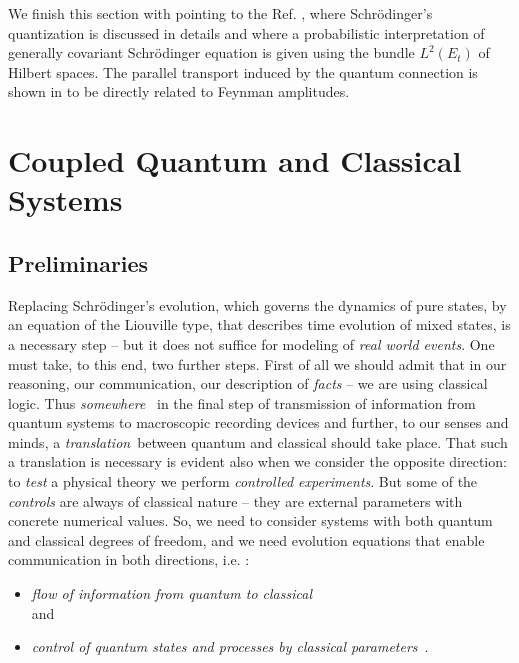 \documentclass[12pt]{article}
\begin{document}
We finish this section with pointing to the Ref.  \cite{jamo}, 
where Schr\"{o}din\-ger's quantization is discussed in details and
where a probabilistic interpretation of generally covariant
Schr\"{o}dinger equation is given using the bundle
$L^{2} (E_{t})$ of Hilbert spaces.  The parallel transport induced
by the quantum connection is shown in \cite{jamo} to be directly
related to Feynman amplitudes. 
\section{Coupled Quantum and Classical Systems}
\subsection{Preliminaries}
Replacing Schr\"odinger's evolution, which governs the dynamics
of pure states, by an equation of the
Liouville type, that describes time evolution of mixed states,
is a necessary step -- but it does not suffice for modeling
of {\em real world events}.  One must take,  to this end,  two further steps. 
First of all we should admit that in our reasoning,  our communication,  our
description of {\em facts} -- we are using classical logic.  Thus {\em somewhere }\
in the final step of transmission of information from quantum systems to
macroscopic recording devices and further, to our senses and minds,
a {\em translation}\ between quantum and classical
 should
take place.  That such a translation is necessary is evident also when we
consider the opposite direction:  to {\em test} a physical theory we perform 
{\em controlled experiments}.  But some of the {\em controls} are always of
classical nature -- they are external parameters with concrete numerical
values.  So,  we need to consider systems with both quantum and classical
degrees of freedom,  and we need evolution equations that enable communication 
in both directions,  i.e. :  \begin{itemize}
\item {\em flow of information from quantum to classical} \\and \item 
{\em control of quantum states and processes by
classical parameters}\ . 
\end{itemize}
\end{document}
